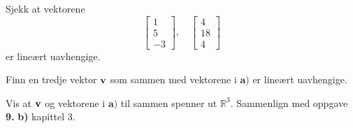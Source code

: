 








\begin{oppgave}

\begin{punkt}
Sjekk at vektorene $$\begin{bmatrix}
1\\
5\\
-3
\end{bmatrix}, \quad \begin{bmatrix}
4\\
18\\
4
\end{bmatrix}$$ er lineært uavhengige.
\end{punkt}

\begin{punkt}
Finn en tredje vektor $\mathbf{v}$ som sammen med vektorene i $\textbf{a)}$ er lineært uavhengige.
\end{punkt}


\begin{punkt}
Vis at $\mathbf{v}$ og vektorene i $\textbf{a)}$ til sammen spenner ut $\mathbb{R}^3$. Sammenlign med oppgave \textbf{9.} \textbf{b)} kapittel 3.
\end{punkt}

\end{oppgave}

